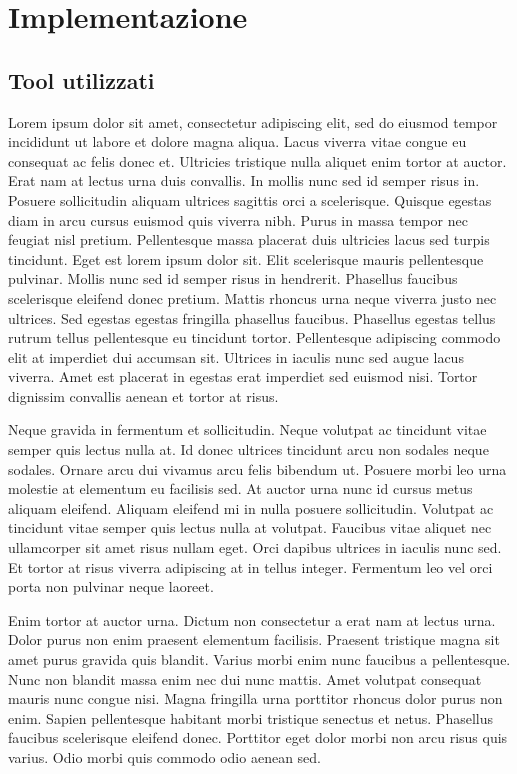 \documentclass[a4]{report}
\begin{document}
\chapter{Implementazione}

\section{Tool utilizzati}
Lorem ipsum dolor sit amet, consectetur adipiscing elit, sed do eiusmod tempor incididunt ut labore et dolore magna aliqua. Lacus viverra vitae congue eu consequat ac felis donec et. Ultricies tristique nulla aliquet enim tortor at auctor. Erat nam at lectus urna duis convallis. In mollis nunc sed id semper risus in. Posuere sollicitudin aliquam ultrices sagittis orci a scelerisque. Quisque egestas diam in arcu cursus euismod quis viverra nibh. Purus in massa tempor nec feugiat nisl pretium. Pellentesque massa placerat duis ultricies lacus sed turpis tincidunt. Eget est lorem ipsum dolor sit. Elit scelerisque mauris pellentesque pulvinar. Mollis nunc sed id semper risus in hendrerit. Phasellus faucibus scelerisque eleifend donec pretium. Mattis rhoncus urna neque viverra justo nec ultrices. Sed egestas egestas fringilla phasellus faucibus. Phasellus egestas tellus rutrum tellus pellentesque eu tincidunt tortor. Pellentesque adipiscing commodo elit at imperdiet dui accumsan sit. Ultrices in iaculis nunc sed augue lacus viverra. Amet est placerat in egestas erat imperdiet sed euismod nisi. Tortor dignissim convallis aenean et tortor at risus.

Neque gravida in fermentum et sollicitudin. Neque volutpat ac tincidunt vitae semper quis lectus nulla at. Id donec ultrices tincidunt arcu non sodales neque sodales. Ornare arcu dui vivamus arcu felis bibendum ut. Posuere morbi leo urna molestie at elementum eu facilisis sed. At auctor urna nunc id cursus metus aliquam eleifend. Aliquam eleifend mi in nulla posuere sollicitudin. Volutpat ac tincidunt vitae semper quis lectus nulla at volutpat. Faucibus vitae aliquet nec ullamcorper sit amet risus nullam eget. Orci dapibus ultrices in iaculis nunc sed. Et tortor at risus viverra adipiscing at in tellus integer. Fermentum leo vel orci porta non pulvinar neque laoreet.

Enim tortor at auctor urna. Dictum non consectetur a erat nam at lectus urna. Dolor purus non enim praesent elementum facilisis. Praesent tristique magna sit amet purus gravida quis blandit. Varius morbi enim nunc faucibus a pellentesque. Nunc non blandit massa enim nec dui nunc mattis. Amet volutpat consequat mauris nunc congue nisi. Magna fringilla urna porttitor rhoncus dolor purus non enim. Sapien pellentesque habitant morbi tristique senectus et netus. Phasellus faucibus scelerisque eleifend donec. Porttitor eget dolor morbi non arcu risus quis varius. Odio morbi quis commodo odio aenean sed.
\end{document}
